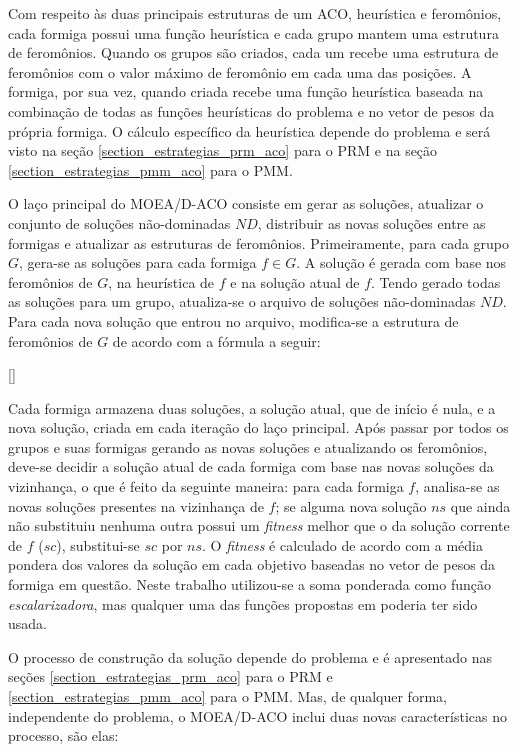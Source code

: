 Com respeito às duas principais estruturas de um ACO, heurística e feromônios, cada formiga possui uma função heurística e cada grupo mantem uma estrutura de feromônios. Quando os grupos são criados, cada um recebe uma estrutura de feromônios com o valor máximo de feromônio em cada uma das posições. A formiga, por sua vez, quando criada recebe uma função heurística baseada na combinação de todas as funções heurísticas do problema e no vetor de pesos da própria formiga. O cálculo específico da heurística depende do problema e será visto na seção \ref{section_estrategias_prm_aco} para o PRM e na seção \ref{section_estrategias_pmm_aco} para o PMM.

O laço principal do MOEA/D-ACO consiste em gerar as soluções, atualizar o conjunto de soluções não-dominadas $ND$, distribuir as novas soluções entre as formigas e atualizar as estruturas de feromônios. Primeiramente, para cada grupo $G$, gera-se as soluções para cada formiga $f \in G$. A solução é gerada com base nos feromônios de $G$, na heurística de $f$ e na solução atual de $f$. Tendo gerado todas as soluções para um grupo, atualiza-se o arquivo de soluções não-dominadas $ND$. Para cada nova solução que entrou no arquivo, modifica-se a estrutura de feromônios de $G$ de acordo com a fórmula a seguir:

[]

Cada formiga armazena duas soluções, a solução atual, que de início é nula, e a nova solução, criada em cada iteração do laço principal. Após passar por todos os grupos e suas formigas gerando as novas soluções e atualizando os feromônios, deve-se decidir a solução atual de cada formiga com base nas novas soluções da vizinhança, o que é feito da seguinte maneira: para cada formiga $f$, analisa-se as novas soluções presentes na vizinhança de $f$; se alguma nova solução $ns$ que ainda não substituiu nenhuma outra possui um \textit{fitness} melhor que o da solução corrente de $f$ ($sc$), substitui-se $sc$ por $ns$. O \textit{fitness} é calculado de acordo com a média pondera dos valores da solução em cada objetivo baseadas no vetor de pesos da formiga em questão. Neste trabalho utilizou-se a soma ponderada como função \textit{escalarizadora}, mas qualquer uma das funções propostas em \cite{Zhang2007} poderia ter sido usada.

O processo de construção da solução depende do problema e é apresentado nas seções \ref{section_estrategias_prm_aco} para o PRM e  \ref{section_estrategias_pmm_aco} para o PMM. Mas, de qualquer forma, independente do problema, o MOEA/D-ACO inclui duas novas características no processo, são elas:

